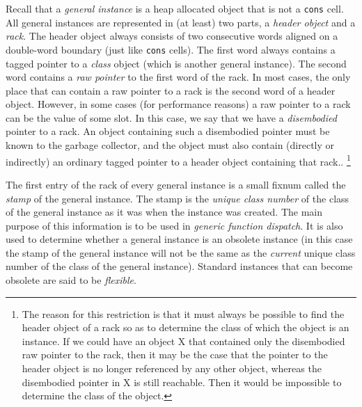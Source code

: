 Recall that a \emph{general instance} is a heap allocated object that
is not a \texttt{cons} cell.  
All general instances are represented in (at
least) two parts, a \emph{header object} and a \emph{rack}.
The header object always consists of two consecutive words aligned on
a double-word boundary (just like \texttt{cons} cells).  The first
word always contains a tagged pointer to a \emph{class} object (which
is another general instance).  The second word contains a \emph{raw
  pointer} to the first word of the rack.  In most cases,
the only place that can contain a raw pointer to a rack is
the second word of a header object.  However, in some cases (for
performance reasons) a raw pointer to a rack can be the
value of some slot.  In this case, we say that we have a
\emph{disembodied} pointer to a rack.  An object containing
such a disembodied pointer must be known to the garbage collector, and
the object must also contain (directly or indirectly) an ordinary
tagged \cl{} pointer to a header object containing that rack..%
\footnote{The reason for this restriction is that it must always be possible
  to find the header object of a rack so as to determine
  the class of which the object is an instance.  If we could have
  an object X that contained only the disembodied raw pointer to the
  rack, then it may be the case that the pointer to the
  header object is no longer referenced by any other object, whereas
  the disembodied pointer in X is still reachable.  Then it would be
  impossible to determine the class of the object.}

The first entry of the rack of every general instance is a
small fixnum called the \emph{stamp} of the general instance.  The
stamp is the \emph{unique class number} of the class of the general
instance as it was when the instance was created.  The main purpose of
this information is to be used in \emph{generic function dispatch}.
It is also used to determine whether a general instance is an obsolete
instance (in this case the stamp of the general instance will not be
the same as the \emph{current} unique class number of the class of the
general instance).  Standard instances that can become obsolete are
said to be \emph{flexible}.

